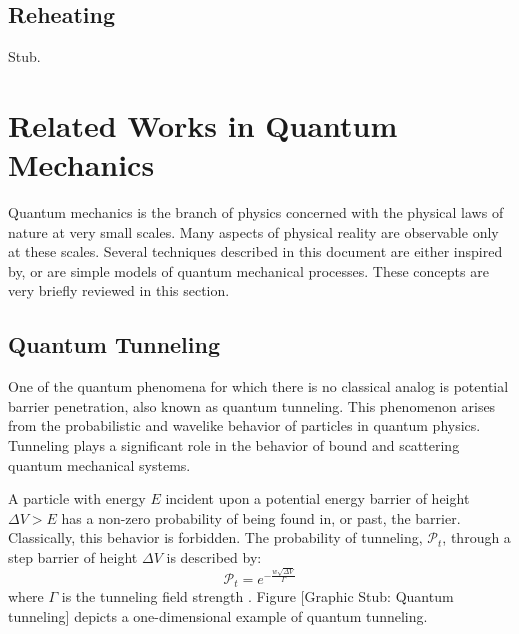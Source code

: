 \documentclass[11pt]{afthesis}
\begin{document}
	\subsection{Reheating}
	Stub.
	
	
	\section{Related Works in Quantum Mechanics}
	
	
	Quantum mechanics is the branch of physics concerned with the physical laws of nature at very small scales. Many aspects of physical reality are observable only at these scales. Several techniques described in this document are either inspired by, or are simple models of quantum mechanical processes. These concepts are very briefly reviewed in this section. 
	
	\subsection{Quantum Tunneling} 
	
	
	One of the quantum phenomena for which there is no classical analog is potential barrier penetration, also known as quantum tunneling. This phenomenon arises from the probabilistic and wavelike behavior of particles in quantum physics. Tunneling plays a significant role in the behavior of bound and scattering quantum mechanical systems.
	
	A particle with energy \begin{math} E \end{math} incident upon a potential energy barrier of height \begin{math} \Delta V > E  \end{math} has a non-zero probability of being found in, or past, the barrier. Classically, this behavior is forbidden. The probability of tunneling, \begin{math} \mathcal{P}_t \end{math}, through a step barrier of height \begin{math} \Delta V  \end{math} is described by: 
	\begin{equation}
	\mathcal{P}_t = e^{-\frac{w \sqrt{\Delta V}}{ \Gamma}} 
	\end{equation} where \begin{math} \Gamma \end{math} is the tunneling field strength \cite{mukherjee2015multivariatesearchqa}. Figure [Graphic Stub: Quantum tunneling] depicts a one-dimensional example of quantum tunneling.
	
\end{document}

